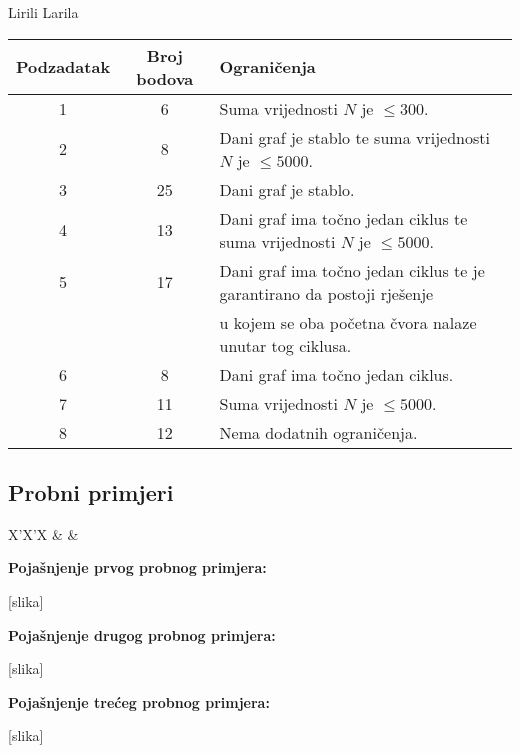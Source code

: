 \begin{statement}[
  problempoints=100,
  timelimit=3 sekunde,
  memorylimit=512 MiB,
]{Lirili Larila}
{\renewcommand{\arraystretch}{1.4}
  \setlength{\tabcolsep}{6pt}
  \begin{tabular}{ccl}
   Podzadatak & Broj bodova & Ograničenja \\ \midrule
    1 & 6 & Suma vrijednosti $N$ je $\leq 300$. \\
    2 & 8 & Dani graf je stablo te suma vrijednosti $N$ je $\leq 5000$. \\
    3 & 25 & Dani graf je stablo. \\
    4 & 13 & Dani graf ima točno jedan ciklus te suma vrijednosti $N$ je $\leq 5000$. \\
    5 & 17 & Dani graf ima točno jedan ciklus te je garantirano da postoji rješenje  \\
      &    & u kojem se oba početna čvora nalaze unutar tog ciklusa.  \\
    6 & 8 & Dani graf ima točno jedan ciklus. \\
    7 & 11 & Suma vrijednosti $N$ je $\leq 5000$. \\
    8 & 12 & Nema dodatnih ograničenja. \\
\end{tabular}}

\subsection*{Probni primjeri}
\begin{tabularx}{\textwidth}{X'X'X}
 &
 &
\end{tabularx}

\textbf{Pojašnjenje prvog probnog primjera:}

[slika]

\textbf{Pojašnjenje drugog probnog primjera:}

[slika]

\textbf{Pojašnjenje trećeg probnog primjera:}

[slika]

\end{statement}

